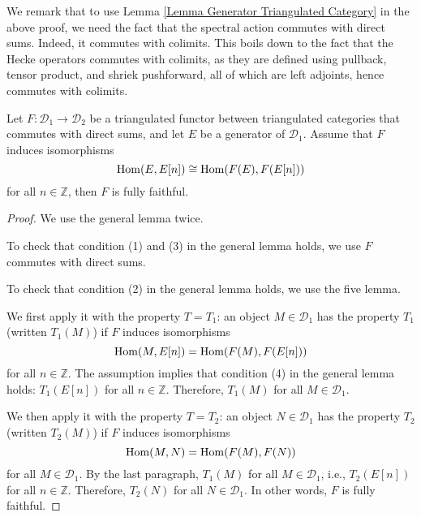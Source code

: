 \begin{remark}
	We remark that to use Lemma \ref{Lemma Generator Triangulated Category} in the above proof, we need the fact that the spectral action commutes with direct sums. Indeed, it commutes with colimits. This boils down to the fact that the Hecke operators commutes with colimits, as they are defined using pullback, tensor product, and shriek pushforward, all of which are left adjoints, hence commutes with colimits.
\end{remark}



\begin{lemma}\label{Lemma Generator Triangulated Category}
	Let $F: \mathcal{D}_1 \to \mathcal{D}_2$ be a triangulated functor between triangulated categories that commutes with direct sums, and let $E$ be a generator of $\mathcal{D}_1$. Assume that $F$ induces isomorphisms
	$$\operatorname{\operatorname{Hom}}(E, E[n]) \cong \operatorname{\operatorname{Hom}}(F(E), F(E[n]))$$
	for all $n \in \mathbb{Z}$, then $F$ is fully faithful.
\end{lemma}

\begin{proof}
	We use the general lemma \cite[Stack, Tag 0ATH]{stacks-project} twice. 
	
	To check that condition (1) and (3) in the general lemma holds, we use $F$ commutes with direct sums.
	
	To check that condition (2) in the general lemma holds, we use the five lemma.
	
	We first apply it with the property $T=T_1$: an object $M \in \mathcal{D}_1$ has the property $T_1$ (written $T_1(M)$) if $F$ induces isomorphisms
	$$\operatorname{\operatorname{Hom}}(M, E[n])=\operatorname{\operatorname{Hom}}(F(M), F(E[n]))$$
	for all $n \in \mathbb{Z}$. The assumption implies that condition (4) in the general lemma holds: $T_1(E[n])$ for all $n \in \mathbb{Z}$. Therefore, $T_1(M)$ for all $M \in \mathcal{D}_1$.
	
	We then apply it with the property $T=T_2$: an object $N \in \mathcal{D}_1$ has the property $T_2$ (written $T_2(M)$) if $F$ induces isomorphisms
	$$\operatorname{\operatorname{Hom}}(M, N)=\operatorname{\operatorname{Hom}}(F(M), F(N))$$
	for all $M \in \mathcal{D}_1$. By the last paragraph, $T_1(M)$ for all $M \in \mathcal{D}_1$, i.e., $T_2(E[n])$ for all $n \in \mathbb{Z}$. Therefore, $T_2(N)$ for all $N \in \mathcal{D}_1$. In other words, $F$ is fully faithful.
\end{proof}

